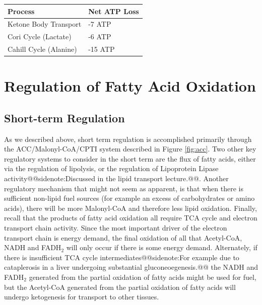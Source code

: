 \documentclass{tufte-handout}
\makeatletter
\def\sidenote#1{@@sidenote:#1@@}
\makeatother
\begin{document}
\begin{margintable}
\centering
\caption{Energy costs of the macromolecule transport processes discussed this year.  Refer to the gluconeogenesis notes for details about the Cori and Cahill cycles.}
\label{tab:transport-processes}
\begin{tabular}{@{}ll@{}}
\toprule
\textbf{Process} & \textbf{Net ATP Loss} \\ \midrule
Ketone Body Transport  &  -7 ATP  \\
Cori Cycle (Lactate)    & -6 ATP  \\
Cahill Cycle (Alanine)       & -15 ATP \\ \bottomrule
\end{tabular}
\end{margintable}

\section{Regulation of Fatty Acid Oxidation}

\subsection{Short-term Regulation}

As we described above, short term regulation is accomplished primarily through the ACC/Malonyl-CoA/CPTI system described in Figure \ref{fig:acc}.  Two other key regulatory systems to consider in the short term are the flux of fatty acids, either via the regulation of lipolysis, or the regulation of Lipoprotein Lipase activity\sidenote{Discussed in the lipid transport lecture.}.  Another regulatory mechanism that might not seem as apparent, is that when there is sufficient non-lipid fuel sources (for example an excess of carbohydrates or amino acids), there will be more Malonyl-CoA and therefore less lipid oxidation.  Finally, recall that the products of fatty acid oxidation all require TCA cycle and electron transport chain activity.  Since the most important driver of the electron transport chain is energy demand, the final oxidation of all that Acetyl-CoA, NADH and FADH$_2$ will only occur if there is some energy demand.   Alternately, if there is insufficient TCA cycle intermediates\sidenote{For example due to cataplerosis in a liver undergoing substantial gluconeoegenesis.} the NADH and FADH$_2$ generated from the partial oxidation of fatty acids might be used for fuel, but the Acetyl-CoA generated from the partial oxidation of fatty acids will undergo ketogenesis for transport to other tissues.
\end{document}
